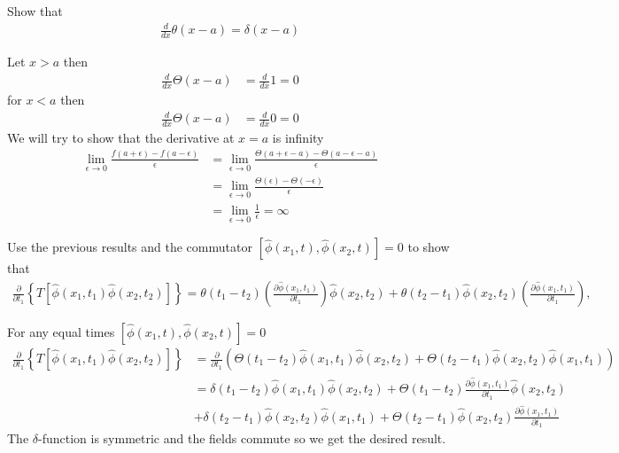 \documentclass[working, oneside]{../../Preambles/tuftebook}
\begin{document}
\begin{exercise}[2]
Show that
\begin{align*}
\frac{d}{dx} \theta(x - a) = \delta(x - a)
\end{align*}
\end{exercise}
\begin{solution}
Let $x > a$ then
\begin{align*}
\frac{d}{dx} \Theta(x-a)
&= \frac{d}{dx} 1 = 0
\end{align*}
for $x < a$ then
\begin{align*}
\frac{d}{dx} \Theta(x-a)
&= \frac{d}{dx} 0 = 0
\end{align*}
We will try to show that the derivative at $x=a$ is infinity
\begin{align*}
\lim_{\epsilon \to 0} \frac{f(a+\epsilon) - f(a-\epsilon)}{\epsilon}
&= \lim_{\epsilon \to 0} \frac{\Theta(a+\epsilon-a) - \Theta(a-\epsilon-a)}{\epsilon} \\
&= \lim_{\epsilon \to 0} \frac{\Theta(\epsilon) - \Theta(-\epsilon)}{\epsilon} \\
&= \lim_{\epsilon \to 0} \frac{1}{\epsilon} = \infty
\end{align*}
\end{solution}
\begin{exercise}[3]
Use the previous results and the commutator $\left[ \hat{\phi}(x_1, t), \hat{\phi}(x_2, t) \right] = 0$ to show that
\begin{align*}
\frac{\partial}{\partial t_1} \left\{ T \left[ \hat{\phi}(x_1, t_1) \hat{\phi}(x_2, t_2) \right] \right\} = \theta(t_1 - t_2) \left( \frac{\partial \hat{\phi}(x_1, t_1)}{\partial t_1} \right) \hat{\phi}(x_2, t_2) + \theta(t_2 - t_1) \hat{\phi}(x_2, t_2) \left( \frac{\partial \hat{\phi}(x_1, t_1)}{\partial t_1} \right),
\end{align*}
\end{exercise}
\begin{solution}
For any equal times $\left[ \hat{\phi}(x_1, t), \hat{\phi}(x_2, t) \right] = 0$
\begin{align*}
\frac{\partial}{\partial t_1} \left\{ T \left[ \hat{\phi}(x_1, t_1) \hat{\phi}(x_2, t_2) \right] \right\}
&= \frac{\partial}{\partial t_1} \left( \Theta(t_1 - t_2) \hat{\phi}(x_1, t_1) \hat{\phi}(x_2, t_2) + \Theta(t_2 - t_1) \hat{\phi}(x_2, t_2) \hat{\phi}(x_1, t_1) \right) \\
&= \delta(t_1 - t_2) \hat{\phi}(x_1, t_1) \hat{\phi}(x_2, t_2) + \Theta(t_1 - t_2) \frac{\partial \hat{\phi}(x_1, t_1)}{\partial t_1} \hat{\phi}(x_2, t_2) \\
&+ \delta(t_2 - t_1) \hat{\phi}(x_2, t_2) \hat{\phi}(x_1, t_1) + \Theta(t_2 - t_1) \hat{\phi}(x_2, t_2) \frac{\partial \hat{\phi}(x_1, t_1)}{\partial t_1}
\end{align*}
The $\delta$-function is symmetric and the fields commute so we get the desired result.
\end{solution}
\end{document}
